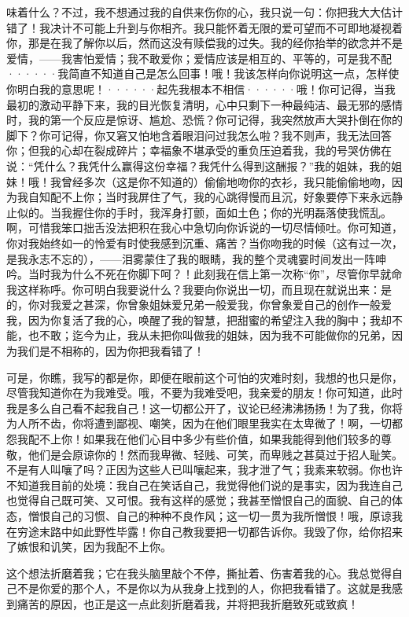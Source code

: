 \documentclass[12pt, UTF8]{ctexbook}
\begin{document}
味着什么？不过，我不想通过我的自供来伤你的心，我只说一句：你把我大大估计错了！我决计不可能上升到与你相齐。我只能怀着无限的爱可望而不可即地凝视着你，那是在我了解你以后，然而这没有赎偿我的过失。我的经你抬举的欲念并不是爱情，——我害怕爱情；我不敢爱你；爱情应该是相互的、平等的，可是我不配······我简直不知道自己是怎么回事！哦！我该怎样向你说明这一点，怎样使你明白我的意思呢！······起先我根本不相信······哦！你可记得，当我最初的激动平静下来，我的目光恢复清明，心中只剩下一种最纯洁、最无邪的感情时，我的第一个反应是惊讶、尴尬、恐慌？你可记得，我突然放声大哭扑倒在你的脚下？你可记得，你又窘又怕地含着眼泪问过我怎么啦？我不则声，我无法回答你；但我的心却在裂成碎片；幸福象不堪承受的重负压迫着我，我的号哭仿佛在说：“凭什么？我凭什么赢得这份幸福？我凭什么得到这酬报？”我的姐妹，我的姐妹！哦！我曾经多次（这是你不知道的）偷偷地吻你的衣衫，我只能偷偷地吻，因为我自知配不上你；当时我屏住了气，我的心跳得慢而且沉，好象要停下来永远静止似的。当我握住你的手时，我浑身打颤，面如土色；你的光明磊落使我慌乱。啊，可惜我笨口拙舌没法把积在我心中急切向你诉说的一切尽情倾吐。你可知道，你对我始终如一的怜爱有时使我感到沉重、痛苦？当你吻我的时候（这有过一次，是我永志不忘的），——泪雾蒙住了我的眼睛，我的整个灵魂霎时间发出一阵呻吟。当时我为什么不死在你脚下呵？！此刻我在信上第一次称“你”，尽管你早就命我这样称呼。你可明白我要说什么？我要向你说出一切，而且现在就说出来：是的，你对我爱之甚深，你曾象姐妹爱兄弟一般爱我，你曾象爱自己的创作一般爱我，因为你复活了我的心，唤醒了我的智慧，把甜蜜的希望注入我的胸中；我却不能，也不敢；迄今为止，我从未把你叫做我的姐妹，因为我不可能做你的兄弟，因为我们是不相称的，因为你把我看错了！
\par 可是，你瞧，我写的都是你，即便在眼前这个可怕的灾难时刻，我想的也只是你，尽管我知道你在为我难受。哦，不要为我难受吧，我亲爱的朋友！你可知道，此时我是多么自己看不起我自己！这一切都公开了，议论已经沸沸扬扬！为了我，你将为人所不齿，你将遭到鄙视、嘲笑，因为在他们眼里我实在太卑微了！啊，一切都怨我配不上你！如果我在他们心目中多少有些价值，如果我能得到他们较多的尊敬，他们是会原谅你的！然而我卑微、轻贱、可笑，而卑贱之甚莫过于招人耻笑。不是有人叫嚷了吗？正因为这些人已叫嚷起来，我才泄了气；我素来软弱。你也许不知道我目前的处境：我自己在笑话自己，我觉得他们说的是事实，因为我连自己也觉得自己既可笑、又可恨。我有这样的感觉；我甚至憎恨自己的面貌、自己的体态，憎恨自己的习惯、自己的种种不良作风；这一切一贯为我所憎恨！哦，原谅我在穷途末路中如此野性毕露！你自己教我要把一切都告诉你。我毁了你，给你招来了嫉恨和讥笑，因为我配不上你。
\par 这个想法折磨着我；它在我头脑里敲个不停，撕扯着、伤害着我的心。我总觉得自己不是你爱的那个人，不是你以为从我身上找到的人，你把我看错了。这就是我感到痛苦的原因，也正是这一点此刻折磨着我，并将把我折磨致死或致疯！
\end{document}
